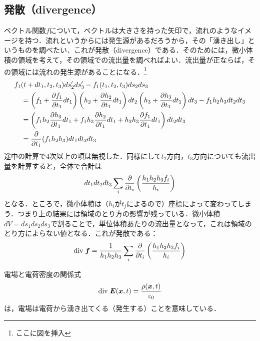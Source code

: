 \documentclass[a4paper,10pt,uplatex]{jsarticle}
\renewcommand{\div}{\mathrm{div}\;}
\newcommand{\E}{\vb*{E}}
\newcommand{\x}{\vb*{x}}
\begin{document}
\subsection{発散（divergence）}
ベクトル関数$f$について，ベクトルは大きさを持った矢印で，流れのようなイメージを持つ．流れというからには発生源があるだろうから，その「湧き出し」というものを調べたい．これが発散（divergence）である．そのためには，微小体積の領域を考えて，その領域での流出量を調べればよい．流出量が正ならば，その領域には流れの発生源があることになる．\footnote{ここに図を挿入}
\begin{align}
    &f_1(t+dt_1, t_2, t_3) ds_2' ds_3' - f_1(t_1, t_2, t_3) ds_2 ds_3 \\
    &\quad = \left(f_1 + \pdv{f_1}{t_1}dt_1\right)\left(h_2+\pdv{h_2}{t_1}dt_1\right)dt_2\left(h_3+\pdv{h_3}{t_1}dt_1\right)dt_3 - f_1h_2h_3dt_2dt_3 \\
    &\quad = \left(f_1h_2\pdv{h_3}{t_1}dt_1 + f_1h_3\pdv{h_2}{t_1}dt_1 + h_2h_3\pdv{f_1}{t_1}dt_1\right)dt_2dt_3 \\
    &\quad = \pdv{t_1}(f_1h_2h_3)dt_1dt_2dt_3
\end{align}
途中の計算で4次以上の項は無視した．同様にして$t_2$方向，$t_3$方向についても流出量を計算すると，全体で合計は
\begin{equation}
    dt_1dt_2dt_3 \sum_i \pdv{t_i}\left(\frac{h_1h_2h_3f_i}{h_i}\right)
\end{equation}
となる．ところで，微小体積は（$h_i$が$t_j$によるので）座標によって変わってしまう．つまり上の結果には領域のとり方の影響が残っている．微小体積$dV = ds_1ds_2ds_3$で割ることで，単位体積あたりの流出量となって，これは領域のとり方によらない値となる．これが発散である：
\begin{equation}
    \div \vb*{f} = \frac{1}{h_1h_2h_3} \sum_i \pdv{t_i}\left(\frac{h_1h_2h_3f_i}{h_i}\right)
\end{equation}

電場と電荷密度の関係式
\begin{equation}
    \div \E(\x,t) = \frac{\rho(\x,t)}{\varepsilon_0}
\end{equation}
は，電場は電荷から湧き出てくる（発生する）ことを意味している．
\end{document}

